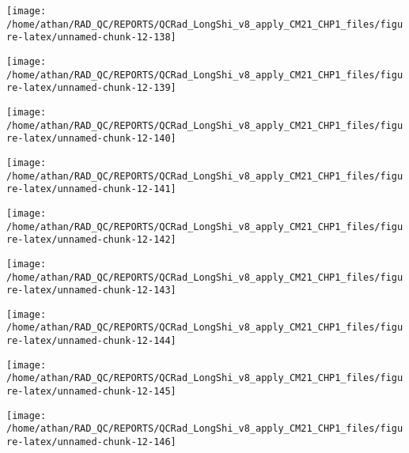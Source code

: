 \documentclass[
  10pt,
  a4paper,oneside]{article}
\begin{document}
\begin{center}\texttt{[image: /home/athan/RAD\_QC/REPORTS/QCRad\_LongShi\_v8\_apply\_CM21\_CHP1\_files/figure-latex/unnamed-chunk-12-138]} \end{center}

\begin{center}\texttt{[image: /home/athan/RAD\_QC/REPORTS/QCRad\_LongShi\_v8\_apply\_CM21\_CHP1\_files/figure-latex/unnamed-chunk-12-139]} \end{center}

\begin{center}\texttt{[image: /home/athan/RAD\_QC/REPORTS/QCRad\_LongShi\_v8\_apply\_CM21\_CHP1\_files/figure-latex/unnamed-chunk-12-140]} \end{center}

\begin{center}\texttt{[image: /home/athan/RAD\_QC/REPORTS/QCRad\_LongShi\_v8\_apply\_CM21\_CHP1\_files/figure-latex/unnamed-chunk-12-141]} \end{center}

\begin{center}\texttt{[image: /home/athan/RAD\_QC/REPORTS/QCRad\_LongShi\_v8\_apply\_CM21\_CHP1\_files/figure-latex/unnamed-chunk-12-142]} \end{center}

\begin{center}\texttt{[image: /home/athan/RAD\_QC/REPORTS/QCRad\_LongShi\_v8\_apply\_CM21\_CHP1\_files/figure-latex/unnamed-chunk-12-143]} \end{center}

\begin{center}\texttt{[image: /home/athan/RAD\_QC/REPORTS/QCRad\_LongShi\_v8\_apply\_CM21\_CHP1\_files/figure-latex/unnamed-chunk-12-144]} \end{center}

\begin{center}\texttt{[image: /home/athan/RAD\_QC/REPORTS/QCRad\_LongShi\_v8\_apply\_CM21\_CHP1\_files/figure-latex/unnamed-chunk-12-145]} \end{center}

\begin{center}\texttt{[image: /home/athan/RAD\_QC/REPORTS/QCRad\_LongShi\_v8\_apply\_CM21\_CHP1\_files/figure-latex/unnamed-chunk-12-146]} \end{center}
\end{document}
